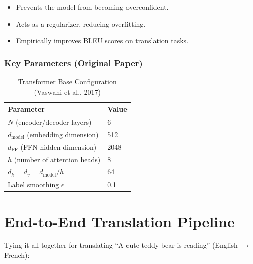 \documentclass[11pt, a4paper]{article}
\begin{document}
\begin{itemize}[leftmargin=2em]
  \item Prevents the model from becoming overconfident.
  \item Acts as a regularizer, reducing overfitting.
  \item Empirically improves BLEU scores on translation tasks.
\end{itemize}

\subsubsection{Key Parameters (Original Paper)}

\begin{table}[h]
\centering
\caption{Transformer Base Configuration (Vaswani et al., 2017)}
\begin{tabular}{@{}ll@{}}
\toprule
\textbf{Parameter} & \textbf{Value} \\
\midrule
$N$ (encoder/decoder layers) & 6 \\
$d_{\text{model}}$ (embedding dimension) & 512 \\
$d_{\text{FF}}$ (FFN hidden dimension) & 2048 \\
$h$ (number of attention heads) & 8 \\
$d_k = d_v = d_{\text{model}} / h$ & 64 \\
Label smoothing $\epsilon$ & 0.1 \\
\bottomrule
\end{tabular}
\end{table}

\section{End-to-End Translation Pipeline}

Tying it all together for translating ``A cute teddy bear is reading'' (English $\to$ French):
\end{document}
